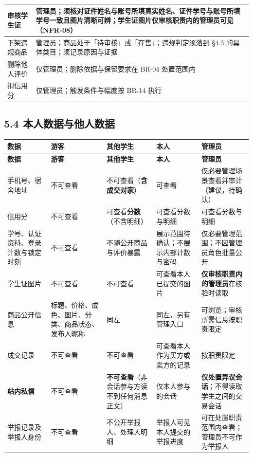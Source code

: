 \documentclass[12pt,a4paper]{ctexart}
\begin{document}
{\begin{longtable}{|p{2.75cm}|p{13.25cm}|}
\hline
审核学生证 & 管理员；须核对\textbf{证件姓名与账号所填真实姓名}、\textbf{证件学号与账号所填学号}一致且图片清晰可辨；学生证图片\textbf{仅审核职责内的管理员}可见（NFR-08） \\
\hline
下架违规商品 & 管理员；商品处于「待审核」或「在售」；违规判定须落到 §4.3 的具体类目；须记录原因与证据 \\
\hline
删除他人评价 & 仅管理员；删除依据与保留要求在 BR-04 处置范围内 \\
\hline
扣信用分 & 仅管理员；触发条件与幅度按 BR-14 执行 \\
\hline
\end{longtable}
}


\subsection*{5.4 本人数据与他人数据}

{\footnotesize
\begin{longtable}{|p{2.79cm}|p{3.69cm}|p{3.25cm}|p{2.91cm}|p{3.36cm}|}
\hline
\textbf{数据} & \textbf{游客} & \textbf{其他学生} & \textbf{本人} & \textbf{管理员} \\
\hline
\endfirsthead
\hline
\textbf{数据} & \textbf{游客} & \textbf{其他学生} & \textbf{本人} & \textbf{管理员} \\
\hline
\endhead
\hline
\endfoot
手机号、宿舍地址 & 不可查看 & 不可查看（\textbf{含成交对家}） & 可查看 & 仅必要管理场景查看并审计（建议，待确认） \\
\hline
信用分 & 不可查看 & 可查看\textbf{分数}（不含明细） & 可查看分数与明细 & 可查看分数与明细 \\
\hline
学号、认证资料、登录计数与锁定时刻 & 不可查看 & 不随公开商品与评价暴露 & 展示范围待确认；不展示内部计数与密码 & 仅必要管理范围；不因管理员角色批量公开 \\
\hline
学生证图片 & 不可查看 & 不可查看 & 可查看本人已提交的图片 & \textbf{仅审核职责内的管理员}在核验时读取 \\
\hline
商品公开信息 & 标题、价格、成色、图片、分类、商品状态、发布人昵称 & 同左 & 同左，另有管理入口 & 可浏览；审核所需信息按职责限定 \\
\hline
成交记录 & 不可查看 & 不可查看 & 可查看本人作为买方或卖方的记录 & 按职责限定 \\
\hline
\textbf{站内私信} & 不可查看 & \textbf{不可查看}（非会话参与方读不到任何消息正文） & 仅本人参与的会话 & \textbf{仅处置异议会话}；不得读取学生之间的交易会话 \\
\hline
举报记录及举报人身份 & 不可查看 & 不公开举报人、处理人明细 & 举报人可见本人提交的举报进度 & 可在处置职责范围内查看；管理员不可作为举报人 \\
\hline
\end{longtable}
}
\end{document}
